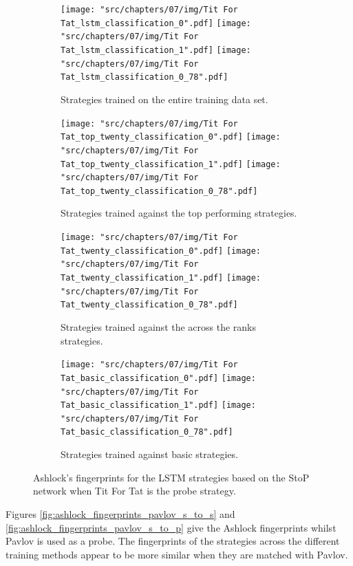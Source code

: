 \begin{figure}[!htbp]
    \begin{subfigure}{\textwidth}
        \texttt{[image: "src/chapters/07/img/Tit For Tat\_lstm\_classification\_0".pdf]}
        \texttt{[image: "src/chapters/07/img/Tit For Tat\_lstm\_classification\_1".pdf]}
        \texttt{[image: "src/chapters/07/img/Tit For Tat\_lstm\_classification\_0\_78".pdf]}
        \caption{Strategies trained on the entire training data set.}
    \end{subfigure}
    \begin{subfigure}{\textwidth}
        \texttt{[image: "src/chapters/07/img/Tit For Tat\_top\_twenty\_classification\_0".pdf]}
        \texttt{[image: "src/chapters/07/img/Tit For Tat\_top\_twenty\_classification\_1".pdf]}
        \texttt{[image: "src/chapters/07/img/Tit For Tat\_top\_twenty\_classification\_0\_78".pdf]}
        \caption{Strategies trained against the top performing strategies.}
    \end{subfigure}
    \begin{subfigure}{\textwidth}
        \texttt{[image: "src/chapters/07/img/Tit For Tat\_twenty\_classification\_0".pdf]}
        \texttt{[image: "src/chapters/07/img/Tit For Tat\_twenty\_classification\_1".pdf]}
        \texttt{[image: "src/chapters/07/img/Tit For Tat\_twenty\_classification\_0\_78".pdf]}
        \caption{Strategies trained against the across the ranks strategies.}
    \end{subfigure}
    \begin{subfigure}{\textwidth}
        \texttt{[image: "src/chapters/07/img/Tit For Tat\_basic\_classification\_0".pdf]}
        \texttt{[image: "src/chapters/07/img/Tit For Tat\_basic\_classification\_1".pdf]}
        \texttt{[image: "src/chapters/07/img/Tit For Tat\_basic\_classification\_0\_78".pdf]}
        \caption{Strategies trained against basic strategies.}
    \end{subfigure}
    \caption{Ashlock's fingerprints for the LSTM strategies based on the StoP
    network when Tit For Tat is the probe strategy.}\label{fig:ashlock_fingerprints_tft_s_to_p}
\end{figure}

Figures \ref{fig:ashlock_fingerprints_pavlov_s_to_s} and
\ref{fig:ashlock_fingerprints_pavlov_s_to_p} give the Ashlock fingerprints
whilst Pavlov is used as a probe. The fingerprints of the strategies across the
different training methods appear to be more similar when they are matched with
Pavlov.

